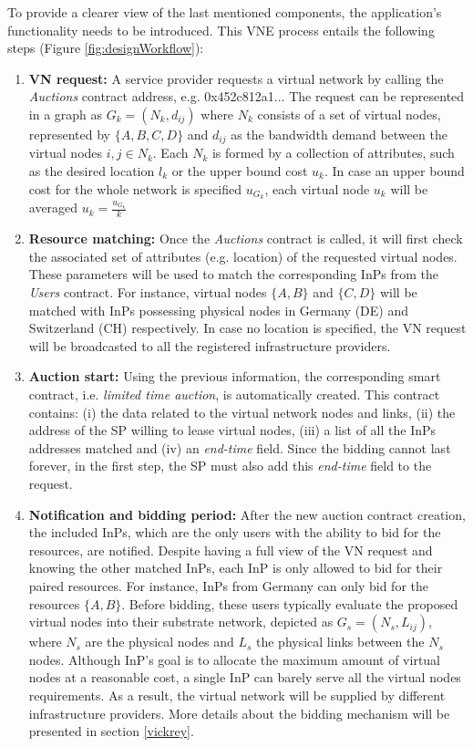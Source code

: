 To provide a clearer view of the last mentioned components, the application's functionality needs to be introduced. This VNE process entails the following steps (Figure \ref{fig:designWorkflow}):

\begin{enumerate}
    \item \textbf{VN request:} A service provider requests a virtual network by calling the \textit{Auctions} contract address, e.g. 0x452c812a1... The request can be represented in a graph as $G_k = (N_k , d_{ij})$ where $N_k$ consists of a set of virtual nodes, represented by $\{A,B,C,D\}$ and $d_{ij}$ as the bandwidth demand between the virtual nodes $i,j \in N_k$. Each $N_k$ is formed by a collection of attributes, such as the desired location $l_k$ or the upper bound cost $u_k$. In case an upper bound cost for the whole network is specified $u_{G_k}$, each virtual node $u_k$ will be averaged $u_k = \frac{u_{G_k}}{k}$
    \item \textbf{Resource matching:} Once the \textit{Auctions} contract is called, it will first check the associated set of attributes (e.g. location) of the requested virtual nodes. These parameters will be used to match the corresponding InPs from the \textit{Users} contract. For instance, virtual nodes $\{A,B\}$ and $\{C,D\}$ will be matched with InPs possessing physical nodes in Germany (DE) and Switzerland (CH) respectively. In case no location is specified, the VN request will be broadcasted to all the registered infrastructure providers.
	\item \textbf{Auction start:} Using the previous information, the corresponding smart contract, i.e. \textit{limited time auction}, is automatically created. This contract contains: (i) the data related to the virtual network nodes and links, (ii) the address of the SP willing to lease virtual nodes, (iii) a list of all the InPs addresses matched and (iv) an \textit{end-time} field. Since the bidding cannot last forever, in the first step, the SP must also add this \textit{end-time} field to the request.
 	\item \textbf{Notification and bidding period:} After the new auction contract creation, the included InPs, which are the only users with the ability to bid for the resources, are notified. Despite having a full view of the VN request and knowing the other matched InPs, each InP is only allowed to bid for their paired resources. For instance, InPs from Germany can only bid for the resources $\{A,B\}$. Before bidding, these users typically evaluate the proposed virtual nodes into their substrate network, depicted as $G_s = (N_s , L_{ij})$, where $N_s$ are the physical nodes and $L_s$ the physical links between the $N_s$ nodes. Although InP's goal is to allocate the maximum amount of virtual nodes at a reasonable cost, a single InP can barely serve all the virtual nodes requirements. As a result, the virtual network will be supplied by different infrastructure providers. More details about the bidding mechanism will be presented in section \ref{vickrey}.

\end{enumerate}
